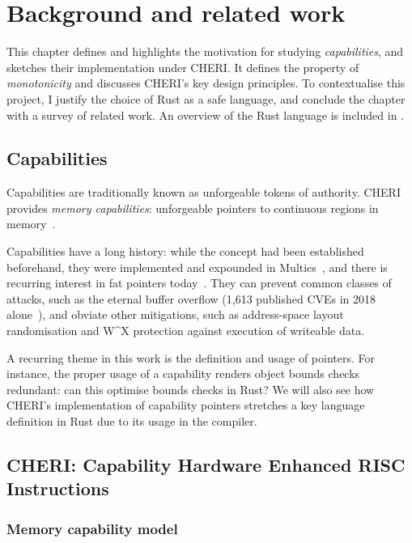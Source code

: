 \documentclass[dissertation.tex]{subfiles}
\begin{document}
\chapter{Background and related work}
\label{ch:bg}


This chapter defines and highlights the motivation for studying
\emph{capabilities}, and sketches their implementation under CHERI.
It defines the property of \emph{monotonicity} and discusses CHERI's key
design principles.
To contextualise this project, I justify the choice of Rust as a safe
language, and conclude the chapter with a survey of related work.
An overview of the Rust language is included in .


\section{Capabilities}
\label{sec:bg-caps}
Capabilities are traditionally known as unforgeable tokens of authority.
CHERI provides \emph{memory capabilities}: unforgeable pointers to
continuous regions in memory~\cite{cheri-risc-2014}.

Capabilities have a long history: while the concept had been established
beforehand, they were implemented and expounded in
Multics~\cite{bell-lapadula}, and there is recurring interest in fat
pointers today~\cite{devietti-hardbound,lowfat-kwon}.
They can prevent common classes of attacks, such as the
eternal buffer overflow (1,613 published CVEs in 2018
alone~\cite{nist-nvd-overflow-2018}), and obviate other mitigations,
such as address-space layout randomisation and W\^{}X protection
against execution of writeable data.

A recurring theme in this work is the definition and usage of pointers.
For instance, the proper usage of a capability renders object bounds
checks redundant: can this optimise bounds checks in Rust?
We will also see how CHERI's implementation of capability pointers
stretches a key language definition in Rust due to its usage in the
compiler.


\section{CHERI: Capability Hardware Enhanced RISC Instructions}

\subsection{Memory capability model}
\end{document}
